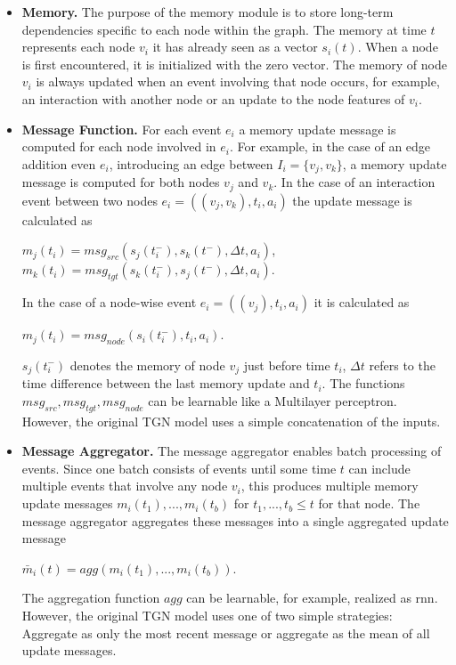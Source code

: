 \begin{itemize}
    \item \textbf{Memory.} The purpose of the memory module is to store long-term dependencies specific to each node within the graph. The memory at time $t$ represents each node $v_i$ it has already seen as a vector $s_i(t)$. When a node is first encountered, it is initialized with the zero vector. The memory of node $v_i$ is always updated when an event involving that node occurs, for example, an interaction with another node or an update to the node features of $v_i$.
    \item \textbf{Message Function.} For each event $e_i$ a memory update message is computed for each node involved in $e_i$. For example, in the case of an edge addition even $e_i$, introducing an edge between $I_i = \{v_j, v_k\}$, a memory update message is computed for both nodes $v_j$ and $v_k$. In the case of an interaction event between two nodes $e_i = ((v_j, v_k), t_i, a_i)$ the update message is calculated as
    \begin{center}
        $m_j(t_i) = msg_{src}(s_j(t_i^-), s_k(t^-), \Delta t, a_i)$, $m_k(t_i) = msg_{tgt}(s_k(t_i^-), s_j(t^-), \Delta t, a_i)$.
    \end{center}
    In the case of a node-wise event $e_i = ((v_j), t_i, a_i)$ it is calculated as
    \begin{center}
        $m_j(t_i) = msg_{node}(s_i(t_i^-), t_i, a_i)$.
    \end{center}
    $s_j(t_i^-)$ denotes the memory of node $v_j$ just before time $t_i$, $\Delta t$ refers to the time difference between the last memory update and $t_i$. The functions $msg_{src}, msg_{tgt}, msg_{node}$ can be learnable like a Multilayer perceptron. However, the original TGN model uses a simple concatenation of the inputs.
    \item \textbf{Message Aggregator.} The message aggregator enables batch processing of events. Since one batch consists of events until some time $t$ can include multiple events that involve any node $v_i$, this produces multiple memory update messages $m_i(t_1),...,m_i(t_b)$ for $t_1,...,t_b \leq t$ for that node. The message aggregator aggregates these messages into a single aggregated update message
    \begin{center}
        $\bar{m}_i(t) = agg(m_i(t_1), ..., m_i(t_b))$.
    \end{center}
    The aggregation function $agg$ can be learnable, for example, realized as \gls{rnn}. However, the original TGN model uses one of two simple strategies: Aggregate as only the most recent message or aggregate as the mean of all update messages.

\end{itemize}

